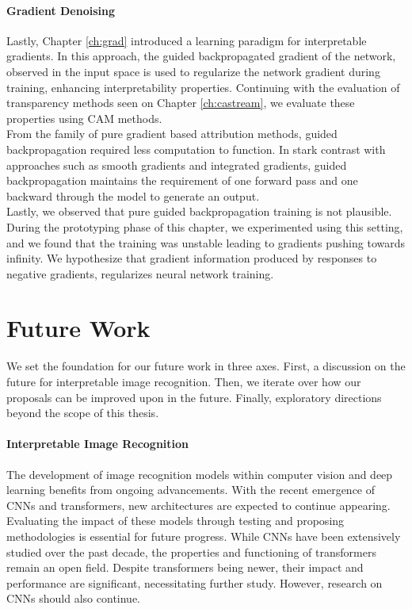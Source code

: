 \paragraph{Gradient Denoising}
\label{sub:conc_grad}
\noindent Lastly, Chapter \ref{ch:grad} introduced a learning paradigm for interpretable gradients. 
In this approach, the guided backpropagated gradient of the network, observed in the input space is 
used to regularize the network gradient during training, enhancing interpretability properties. 
Continuing with the evaluation of transparency methods seen on Chapter \ref{ch:castream}, we 
evaluate these properties using CAM methods.\\

\noindent From the family of pure gradient based attribution methods, guided 
backpropagation required less computation to function. In stark contrast with approaches such as 
smooth gradients and integrated gradients, guided backpropagation maintains the requirement of 
one forward pass and one backward through the model to generate an output.\\

\noindent Lastly, we observed that pure guided backpropagation training is not plausible. During 
the prototyping phase of this chapter, we experimented using this setting, and we found that 
the training was unstable leading to gradients pushing towards infinity. We hypothesize that 
gradient information produced by responses to negative gradients, regularizes neural network 
training.\\

\section{Future Work}
\label{sec:conc_futur}
We set the foundation for our future work in three axes. First, a discussion on the future for 
interpretable image recognition. Then, we iterate over how our proposals can be 
improved upon in the future. Finally, exploratory directions beyond the scope of this thesis.\\

\paragraph{Interpretable Image Recognition}
The development of image recognition models within computer vision and deep learning benefits 
from ongoing advancements. With the recent emergence of CNNs and transformers, new architectures 
are expected to continue appearing. Evaluating the impact of these models through testing and 
proposing methodologies is essential for future progress. While CNNs have been extensively 
studied over the past decade, the properties and functioning of transformers remain an open field. 
Despite transformers being newer, their impact and performance are significant, necessitating 
further study. However, research on CNNs should also continue.\\

